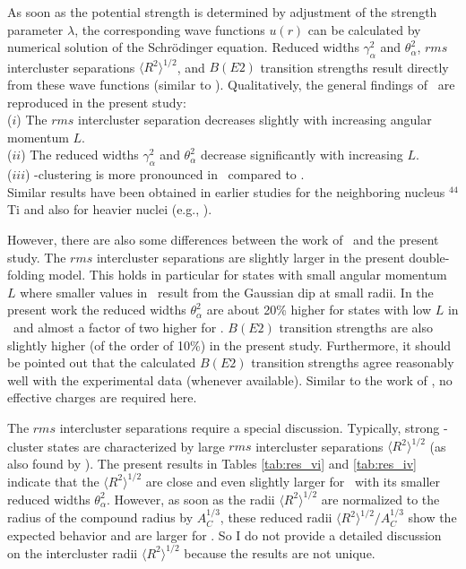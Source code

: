 As soon as the potential strength is determined by adjustment of the strength
parameter $\lambda$, the corresponding wave functions $u(r)$ can be calculated
by numerical solution of the Schr\"odinger equation. Reduced widths
$\gamma_\alpha^2$ and $\theta_\alpha^2$, $rms$ intercluster separations
$\langle R^2\rangle^{1/2}$, and $B(E2)$ transition strengths result directly
from these wave functions (similar to \SM ). Qualitatively, the general
findings of \SM\ are reproduced in the present study: \\
%
\noindent ($i$) The $rms$ intercluster separation decreases slightly with
increasing angular momentum $L$. \\
%
\noindent ($ii$) The reduced widths $\gamma_\alpha^2$ and $\theta_\alpha^2$
decrease significantly with increasing $L$. \\
%
\noindent ($iii$) \al -clustering is more pronounced in \crvi\ compared to
\criv .\\
%
\noindent
Similar results have been obtained in earlier studies for the neighboring
nucleus $^{44}$Ti and also for heavier nuclei (e.g.,
\cite{Sou15,Ohk95,Mic88,Buck75}). 

However, there are also some differences between the work of \SM\ and the
present study. The $rms$ intercluster separations are slightly larger in the
present double-folding model. This holds in particular for states with small
angular momentum $L$ where smaller values in \SM\ result from the Gaussian dip
at small radii. In the present work the reduced widths $\theta_\alpha^2$ are
about 20\% higher for states with low $L$ in \crvi\ and almost a factor of two
higher for \criv . $B(E2)$ transition strengths are also slightly higher (of
the order of 10\%) in the present study. Furthermore, it should be pointed out
that the calculated $B(E2)$ transition strengths agree reasonably well with
the experimental data (whenever available). Similar to the work of \SM , no
effective charges are required here.

The $rms$ intercluster separations require a special discussion. Typically,
strong \al -cluster states are characterized by large $rms$ intercluster
separations $\langle R^2 \rangle^{1/2}$ (as also found by \SM ). The present
results in Tables \ref{tab:res_vi} and \ref{tab:res_iv} indicate that the
$\langle R^2 \rangle^{1/2}$ are close and even slightly larger for \criv\ with
its smaller reduced widths $\theta_\alpha^2$. However, as soon as the radii
$\langle R^2 \rangle^{1/2}$ are normalized to the radius of the compound
radius by $A_C^{1/3}$, these reduced radii $\langle R^2
\rangle^{1/2}/A_C^{1/3}$ show the expected behavior and are larger for \crvi
. So I do not provide a detailed discussion on the intercluster radii $\langle
R^2 \rangle^{1/2}$ because the results are not unique.


